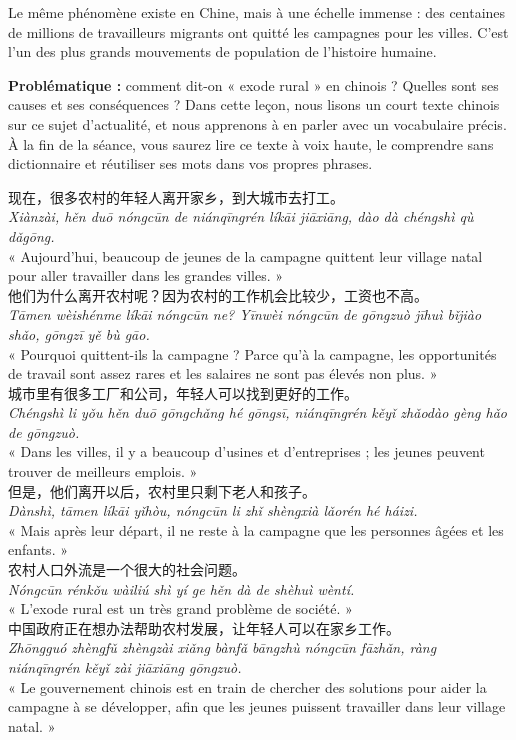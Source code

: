 \documentclass[11pt]{article}
\newcounter{popsec}
\newcounter{popsub}
\newcommand{\courssub}[1]{%
  \stepcounter{popsub}%
  \par\vspace{9pt}\noindent{\popxbold\fontsize{11.5}{13}\selectfont\color{popink}{\color{poporange}\thepopsec.\thepopsub}\hspace{6pt}#1}\par\nopagebreak\vspace{4pt}
}
\begin{document}
Le même phénomène existe en Chine, mais à une échelle immense : des centaines de millions de travailleurs migrants ont quitté les campagnes pour les villes. C'est l'un des plus grands mouvements de population de l'histoire humaine.

\textbf{Problématique :} comment dit-on « exode rural » en chinois ? Quelles sont ses causes et ses conséquences ? Dans cette leçon, nous lisons un court texte chinois sur ce sujet d'actualité, et nous apprenons à en parler avec un vocabulaire précis. À la fin de la séance, vous saurez lire ce texte à voix haute, le comprendre sans dictionnaire et réutiliser ses mots dans vos propres phrases.

\courssub{Le texte : 农村的年轻人}

\begin{textebox}
现在，很多农村的年轻人离开家乡，到大城市去打工。\\
\emph{Xiànzài, hěn duō nóngcūn de niánqīngrén líkāi jiāxiāng, dào dà chéngshì qù dǎgōng.}\\
« Aujourd'hui, beaucoup de jeunes de la campagne quittent leur village natal pour aller travailler dans les grandes villes. »\\[4pt]
他们为什么离开农村呢？因为农村的工作机会比较少，工资也不高。\\
\emph{Tāmen wèishénme líkāi nóngcūn ne? Yīnwèi nóngcūn de gōngzuò jīhuì bǐjiào shǎo, gōngzī yě bù gāo.}\\
« Pourquoi quittent-ils la campagne ? Parce qu'à la campagne, les opportunités de travail sont assez rares et les salaires ne sont pas élevés non plus. »\\[4pt]
城市里有很多工厂和公司，年轻人可以找到更好的工作。\\
\emph{Chéngshì li yǒu hěn duō gōngchǎng hé gōngsī, niánqīngrén kěyǐ zhǎodào gèng hǎo de gōngzuò.}\\
« Dans les villes, il y a beaucoup d'usines et d'entreprises ; les jeunes peuvent trouver de meilleurs emplois. »\\[4pt]
但是，他们离开以后，农村里只剩下老人和孩子。\\
\emph{Dànshì, tāmen líkāi yǐhòu, nóngcūn li zhǐ shèngxià lǎorén hé háizi.}\\
« Mais après leur départ, il ne reste à la campagne que les personnes âgées et les enfants. »\\[4pt]
农村人口外流是一个很大的社会问题。\\
\emph{Nóngcūn rénkǒu wàiliú shì yí ge hěn dà de shèhuì wèntí.}\\
« L'exode rural est un très grand problème de société. »\\[4pt]
中国政府正在想办法帮助农村发展，让年轻人可以在家乡工作。\\
\emph{Zhōngguó zhèngfǔ zhèngzài xiǎng bànfǎ bāngzhù nóngcūn fāzhǎn, ràng niánqīngrén kěyǐ zài jiāxiāng gōngzuò.}\\
« Le gouvernement chinois est en train de chercher des solutions pour aider la campagne à se développer, afin que les jeunes puissent travailler dans leur village natal. »
\end{textebox}
\end{document}
